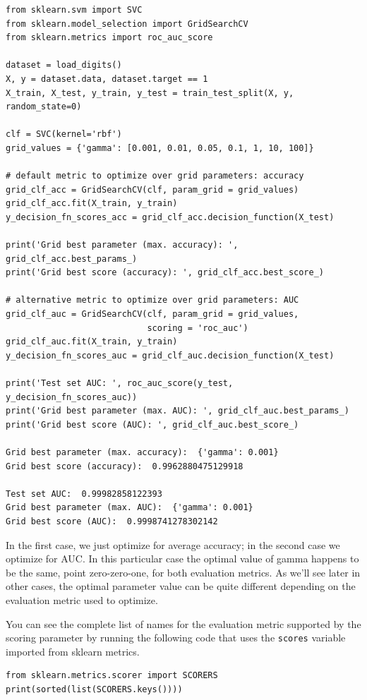 \begin{multicols}{2}
{\tiny
\begin{verbatim}
from sklearn.svm import SVC
from sklearn.model_selection import GridSearchCV
from sklearn.metrics import roc_auc_score

dataset = load_digits()
X, y = dataset.data, dataset.target == 1
X_train, X_test, y_train, y_test = train_test_split(X, y, random_state=0)

clf = SVC(kernel='rbf')
grid_values = {'gamma': [0.001, 0.01, 0.05, 0.1, 1, 10, 100]}

# default metric to optimize over grid parameters: accuracy
grid_clf_acc = GridSearchCV(clf, param_grid = grid_values)
grid_clf_acc.fit(X_train, y_train)
y_decision_fn_scores_acc = grid_clf_acc.decision_function(X_test) 

print('Grid best parameter (max. accuracy): ', grid_clf_acc.best_params_)
print('Grid best score (accuracy): ', grid_clf_acc.best_score_)

# alternative metric to optimize over grid parameters: AUC
grid_clf_auc = GridSearchCV(clf, param_grid = grid_values, 
                            scoring = 'roc_auc')
grid_clf_auc.fit(X_train, y_train)
y_decision_fn_scores_auc = grid_clf_auc.decision_function(X_test) 

print('Test set AUC: ', roc_auc_score(y_test, y_decision_fn_scores_auc))
print('Grid best parameter (max. AUC): ', grid_clf_auc.best_params_)
print('Grid best score (AUC): ', grid_clf_auc.best_score_)

Grid best parameter (max. accuracy):  {'gamma': 0.001}
Grid best score (accuracy):  0.9962880475129918

Test set AUC:  0.99982858122393
Grid best parameter (max. AUC):  {'gamma': 0.001}
Grid best score (AUC):  0.9998741278302142
\end{verbatim}
}

In the first case, we just optimize for average accuracy; in the second case we optimize for AUC. In this particular case the optimal value of gamma happens to be the same, point zero-zero-one, for both evaluation metrics. As we'll see later in other cases, the optimal parameter value can be quite different depending on the evaluation metric used to optimize. 

You can see the complete list of names for the evaluation metric supported by the scoring parameter by running the following code that uses the \texttt{scores} variable imported from sklearn metrics. 

{\scriptsize
\begin{verbatim}
from sklearn.metrics.scorer import SCORERS
print(sorted(list(SCORERS.keys())))


\end{verbatim}}
\end{multicols}
